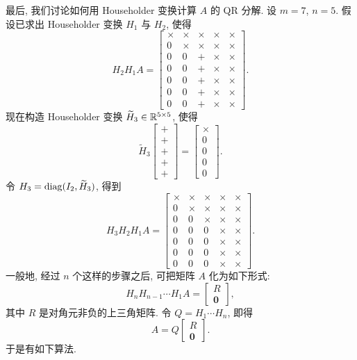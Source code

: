 最后, 我们讨论如何用 Householder 变换计算 $A$ 的 QR 分解. 设 $m=7$, $n=5$. 假设已求出 Householder 变换 $H_1$ 与 $H_2$, 使得
\[
  H_2H_1A=
  \begin{bmatrix}
    \times & \times & \times & \times & \times\\
    0      & \times & \times & \times & \times\\
    0      & 0      & +      & \times & \times\\
    0      & 0      & +      & \times & \times\\
    0      & 0      & +      & \times & \times\\
    0      & 0      & +      & \times & \times\\
    0      & 0      & +      & \times & \times
  \end{bmatrix}.
\]
现在构造 Householder 变换 $\widetilde{H}_3\in\mathbb{R}^{5\times5}$, 使得
\[
  \widetilde{H}_3
  \begin{bmatrix}
    +\\ +\\ +\\ +\\ +
  \end{bmatrix}
  =
  \begin{bmatrix}
    \times\\ 0\\ 0\\ 0\\ 0
  \end{bmatrix}.
\]
令 $H_3=\operatorname{diag}(I_2,\widetilde{H}_3)$, 得到
\[
  H_3H_2H_1A=
  \begin{bmatrix}
    \times & \times & \times & \times & \times\\
    0      & \times & \times & \times & \times\\
    0      & 0      & \times & \times & \times\\
    0      & 0      & 0      & \times & \times\\
    0      & 0      & 0      & \times & \times\\
    0      & 0      & 0      & \times & \times\\
    0      & 0      & 0      & \times & \times
  \end{bmatrix}.
\]
一般地, 经过 $n$ 个这样的步骤之后, 可把矩阵 $A$ 化为如下形式:
\[
  H_nH_{n-1}\cdots H_1A=
  \begin{bmatrix}
    R\\
    \mathbf{0}
  \end{bmatrix},
\]
其中 $R$ 是对角元非负的上三角矩阵. 令 $Q=H_1\cdots H_n$, 即得
\[
  A=Q
  \begin{bmatrix}
    R\\
    \mathbf{0}
  \end{bmatrix}.
\]
于是有如下算法.

